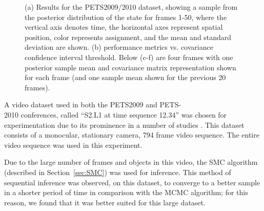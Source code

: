 \documentclass[twocolumn, final]{svjour3}
\begin{document}
\begin{figure}[!]
   \hspace{1pt}
  \caption{ (a) Results for the PETS2009/2010 dataset, showing a sample from the posterior distribution of the state for frames 1-50, where the vertical axis denotes time, the horizontal axes represent spatial position, color represents assignment, and the mean and standard deviation are shown. (b) performance metrics vs. covariance confidence interval threshold. Below (c-f) are four frames with one posterior sample mean and covariance matrix representation shown for each frame (and one sample mean shown for the previous 20 frames).}
  \label{fig:pets2009_results}
\end{figure}

A video dataset used in both the PETS2009 and PETS-\\2010 conferences, called ``S2.L1 at time sequence 12.34'' was chosen for experimentation due to its prominence in a number of studies \cite{ellis_2010,arsic2009multi,berclaz2009multiple,conte2010performance,bolme2009simple,breitenstein2009markovian,ge2009evaluation,alahi2009sparsity,yang2009probabilistic}. This dataset consists of a monocular, stationary camera, 794 frame video sequence. The entire video sequence was used in this experiment. 

Due to the large number of frames and objects in this video, the SMC algorithm (described in Section~\ref{sec:SMC}) was used for inference. This method of sequential inference was observed, on this dataset, to converge to a better sample in a shorter period of time in comparison with the MCMC algorithm; for this reason, we found that it was better suited for this large dataset.
\end{document}
